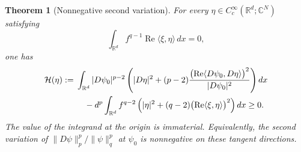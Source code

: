 \documentclass[11pt,a4paper]{article}
\newtheorem{theorem}{Theorem}[section]
\theoremstyle{remark}
\begin{document}
\begin{theorem}[Nonnegative second variation]\label{thm:911stability}
For every $\eta\in C_c^\infty(\mathbb R^d;\mathbb C^N)$ satisfying
\begin{equation}\label{eq:911-tangent}
 \int_{\mathbb R^d}f^{q-1}\operatorname{Re}\langle\xi,\eta\rangle\,dx=0,
\end{equation}
one has
\begin{align}
 \mathcal H(\eta):={}&
 \int_{\mathbb R^d}|D\psi_0|^{p-2}
 \left(|D\eta|^2+(p-2)
 \frac{\bigl(\operatorname{Re}\langle D\psi_0,D\eta\rangle\bigr)^2}
      {|D\psi_0|^2}\right)dx\notag\\
 &\quad-d^p\int_{\mathbb R^d}f^{q-2}
 \left(|\eta|^2+(q-2)
       \bigl(\operatorname{Re}\langle\xi,\eta\rangle\bigr)^2\right)dx
 \ge0.\label{eq:911-hessian}
\end{align}
The value of the integrand at the origin is immaterial. Equivalently,
the second variation of $\|D\psi\|_p^p/\|\psi\|_q^p$ at $\psi_0$ is
nonnegative on these tangent directions.
\end{theorem}
\end{document}
